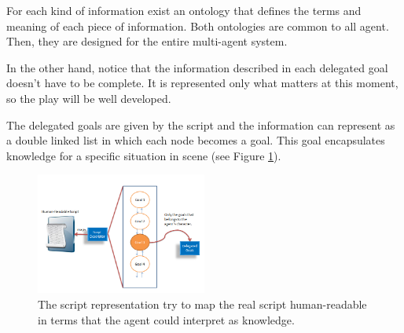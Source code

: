 For each kind of information exist an ontology that defines the terms and meaning of each piece of information. Both ontologies are common to all agent. Then, they are designed for the entire multi-agent system.  

In the other hand, notice that the information described in each delegated goal doesn't have to be complete. It is represented only what matters at this moment, so the play will be well developed.

The delegated goals are given by the script and the information can represent as a double linked list in which each node becomes a goal. This goal encapsulates knowledge for a specific situation in scene  (see Figure  \ref{fig:ScriptRepresentation}).

\begin{figure}
	\centering
	\includegraphics[width=0.5\textwidth]{Images/ScriptRepresentation.png} 
	\caption{The script representation try to map the real script human-readable in terms that the agent could interpret as knowledge.}
	\label{fig:ScriptRepresentation}
\end{figure}


